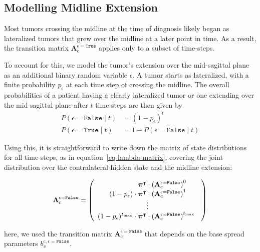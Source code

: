 \documentclass[
  sn-mathphys-num,
]{sn-jnl}
\begin{document}
\subsection{Modelling Midline Extension}\label{sec-midline}

Most tumors crossing the midline at the time of diagnosis likely began
as lateralized tumors that grew over the midline at a later point in
time. As a result, the transition matrix
\(\mathbf{A}_\text{c}^{\epsilon=\texttt{True}}\) applies only to a
subset of time-steps.

To account for this, we model the tumor's extension over the
mid-sagittal plane as an additional binary random variable \(\epsilon\).
A tumor starts as lateralized, with a finite probability \(p_\epsilon\)
at each time step of crossing the midline. The overall probabilities of
a patient having a clearly lateralized tumor or one extending over the
mid-sagittal plane after \(t\) time steps are then given by
%
\[
\begin{aligned}
P(\epsilon = \texttt{False} \mid t) &= (1 - p_\epsilon)^t \\
P(\epsilon = \texttt{True} \mid t) &= 1 - P(\epsilon = \texttt{False} \mid t)
\end{aligned}
\]

Using this, it is straightforward to write down the matrix of state
distributions for all time-steps, as in equation~\ref{eq-lambda-matrix},
covering the joint distribution over the contralateral hidden state and
the midline extension:

\[
\boldsymbol{\Lambda}_\text{c}^{\epsilon=\texttt{False}} =
\left(
\begin{array}{r}
\boldsymbol{\pi}^\intercal \cdot \left( \mathbf{A}_\text{c}^{\epsilon=\texttt{False}} \right)^{0\phantom{t_\text{max}}} \\
(1-p_\epsilon) \cdot \boldsymbol{\pi}^\intercal \cdot \left( \mathbf{A}_\text{c}^{\epsilon=\texttt{False}} \right)^{1\phantom{t_\text{max}}} \\
\hfill \vdots \hfill \\
(1-p_\epsilon)^{t_\text{max}} \cdot \boldsymbol{\pi}^\intercal \cdot \left( \mathbf{A}_\text{c}^{\epsilon=\texttt{False}} \right)^{t_\text{max}\phantom{0}} \\
\end{array}
\right)
\]

here, we used the transition matrix
\(\mathbf{A}_\text{c}^{\epsilon=\texttt{False}}\) that depends on the
base spread parameters \(b_v^{\text{c},\epsilon=\texttt{False}}\).
\end{document}
